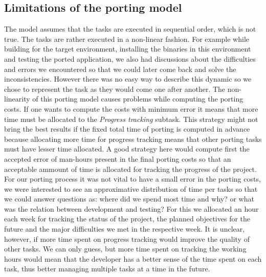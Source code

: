 \subsection{Limitations of the porting model}

The model assumes that the tasks are executed in
sequential order, which is not true. The tasks are rather executed in a
non-linear fashion. For example while building for the target environment,
installing the binaries in this environment and testing the ported application,
we also had discussions about the difficulties and errors we encountered so that
we could later come back and solve the inconsistencies. However there was no
easy way to describe this dynamic so we chose to represent the task as they
would come one after another. The non-linearity of this porting model causes
problems while computing the porting costs. If one wants to compute the costs
with minimum error it means that more time must be allocated to the
\textit{Progress tracking} subtask. This strategy might not bring the best
results if the fixed total time of porting is computed in advance because
allocating more time for progress tracking means that other porting tasks must
have lesser time allocated. A good strategy here would compute first the
accepted error of man-hours present in the final porting costs so that an
acceptable ammount of time is allocated for tracking the progress of the
project. For our porting process it was not vital to have a small error in the
porting costs, we were interested to see an approximative distribution of time
per tasks so that we could answer questions as: where did we spend most time and
why? or what was the relation between development and testing? For this we
allocated an hour each week for tracking the status of the project, the planned
objectives for the future and the major difficulties we met in the respective
week. It is unclear, however, if more time spent on progress tracking would
improve the quality of other tasks. We can only guess, but more time spent on
tracking the working hours would mean that the developer has a better sense of
the time spent on each task, thus better managing multiple tasks at a time in
the future.

